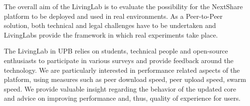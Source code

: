 The overall aim of the LivingLab is to evaluate the possibility for the
NextShare platform to be deployed and used in real environments. As a
Peer-to-Peer solution, both technical and legal challenges have to be
undertaken and LivingLabs provide the framework in which real experiments
take place.

The LivingLab in UPB relies on students, technical people and open-source
enthusiasts to participate in various surveys and provide feedback around the
technology. We are particularly interested in performance related aspects of
the platform, using measures such as peer download speed, peer upload speed,
swarm speed. We provide valuable insight regarding the behavior of the
updated core and advice on improving performance and, thus, quality of
experience for users.
